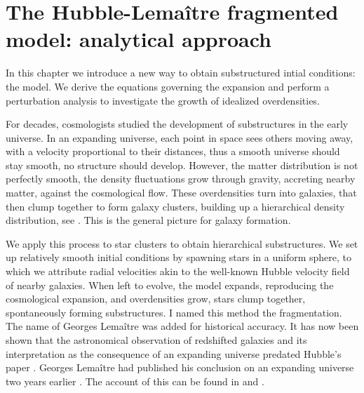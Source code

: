 
\chapter{The Hubble-Lema\^itre fragmented model: analytical approach} 
\label{Chap:analytical}

In this chapter we introduce a new way to obtain substructured intial conditions: the \HubLem model. We derive the equations governing the expansion and perform a perturbation analysis to investigate the growth of idealized overdensities.

\minitoc







For decades, cosmologists studied the development of substructures in the early universe. In an expanding universe, each point in space sees others moving away, with a velocity proportional to their distances, thus a smooth universe should stay smooth, no structure should develop. However, the matter distribution is not perfectly smooth, the density fluctuations grow through gravity, accreting nearby matter, against the cosmological flow.  These overdensities turn into galaxies, that then clump together to form galaxy clusters, building up a hierarchical density distribution, see \cite{White1978,Aarseth1979}. This is the general picture for galaxy formation.

We apply this process to star clusters to obtain hierarchical substructures. We set up relatively smooth initial conditions by spawning stars in a uniform sphere, to which we attribute radial velocities  akin to the well-known Hubble velocity field of nearby galaxies. When left to evolve, the model expands, reproducing the cosmological expansion, and overdensities grow, stars clump together, spontaneously forming substructures. I named this method the \HubLem fragmentation. The name of Georges Lema\^itre was added for historical accuracy. It has now been shown that the astronomical observation of redshifted galaxies and its interpretation as the consequence of an expanding universe predated Hubble's paper \citep{Hubble1929}. Georges Lema\^itre had published his conclusion on an expanding universe two years earlier \citep{Lemaitre1927}. The account of this can be found in \cite{Kragh2003,VanDenBergh2011} and \cite{Freeman2015}.

